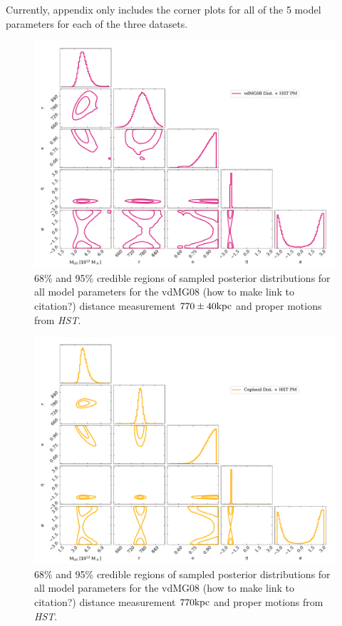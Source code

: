 \documentclass[twocolumn]{aastex631}
\begin{document}
\appendix
Currently, appendix only includes the corner plots for all of the 5 model parameters for each of the three datasets.
\begin{figure}[htb]
  \centering
  \includegraphics[width=0.8\columnwidth]{analyze-runs-all-vdm2012.pdf}
  \caption{\label{fig:contour-vdm}
  68\% and 95\% credible regions of sampled posterior distributions for all
  model parameters for the vdMG08 (how to make link to citation?) distance
  measurement $770\pm 40 \rm kpc$ and proper motions from \textit{HST}.
  }
\end{figure}

\begin{figure}[htb]
  \centering
  \includegraphics[width=0.8\columnwidth]{analyze-runs-all-Dataset3.pdf}
  \caption{\label{fig:contour-dataset3}
    68\% and 95\% credible regions of sampled posterior distributions for all
    model parameters for the vdMG08 (how to make link to citation?) distance
    measurement $770\rm kpc$ and proper motions from \textit{HST}.
  }
\end{figure}
\end{document}

